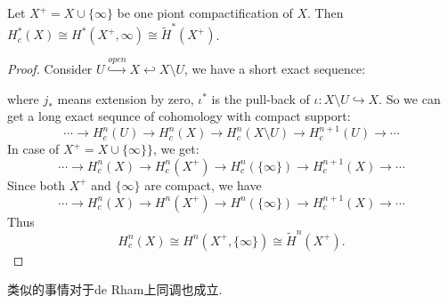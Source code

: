     \begin{theorem}[紧支集上同调与一点紧化空间的约化上同调]\label{thm:c-cohomology_v.s._reductive_cohomology}
        Let $X^{+} = X \cup \{\infty\}$ be one piont compactification of $X$. Then $H^*_c(X)\cong H^*(X^+,\infty)\cong\tilde{H}^*(X^+)$.
    \end{theorem}
    \begin{proof}
        Consider $U\overset{open}{\hookrightarrow} X \hookleftarrow X\setminus U$, we have a short exact sequence:
        
        \begin{center}
        \end{center}
        where $j_*$ means extension by zero, $\iota^*$ is the pull-back of $\iota:X\setminus U\hookrightarrow X$.
        So we can get a long exact sequnce of cohomology with compact support:
        \begin{equation*}
            \cdots\rightarrow H^n_c(U)\rightarrow H^n_c(X)\rightarrow H^n_c(X\setminus U)\rightarrow H^{n+1}_c(U)\rightarrow\cdots
        \end{equation*}
        In case of $X^+ = X\cup\{\infty\}\}$, we get:
        \begin{equation*}
            \cdots\rightarrow H^n_c(X)\rightarrow H^n_c(X^+)\rightarrow H^n_c(\{\infty\})\rightarrow H^{n+1}_c(X)\rightarrow\cdots
        \end{equation*}
        Since both $X^+$ and $\{\infty\}$ are compact, we have
        \begin{equation*}
            \cdots\rightarrow H^n_c(X)\rightarrow H^n(X^+)\rightarrow H^n(\{\infty\})\rightarrow H^{n+1}_c(X)\rightarrow\cdots
        \end{equation*}
        Thus 
        \begin{equation*}
            H^n_c(X)\cong H^n(X^+,\{\infty\})\cong\tilde{H}^n(X^+).
        \end{equation*}
    \end{proof}
    类似的事情对于de Rham上同调也成立.

